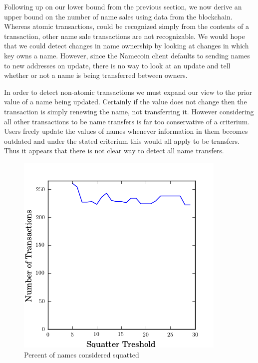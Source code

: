 Following up on our lower bound from the previous section, we now derive an upper bound on the number of name sales using data from the blockchain. Whereas atomic transactions, could be recognized simply from the contents of a transaction, other name sale transactions are not recognizable. We would hope that we could detect changes in name ownership by looking at changes in which key owns a name. However, since the Namecoin client defaults to sending names to new addresses on update, there is no way to look at an update and tell whether or not a name is being transferred between owners.

In order to detect non-atomic transactions we must expand our view to the prior value of a name being updated. Certainly if the value does not change then the transaction is simply renewing the name, not transferring it. However considering all other transactions to be name transfers is far too conservative of a criterium. Users freely update the values of names whenever information in them becomes outdated and under the stated criterium this would all apply to be transfers. Thus it appears that there is not clear way to detect all name transfers.

\begin{figure}
  \centering
  \includegraphics[width=0.9\columnwidth]{figures/transfers}
  \caption{Percent of names considered squatted}
  \label{fig:percentSquatter}
\end{figure}


